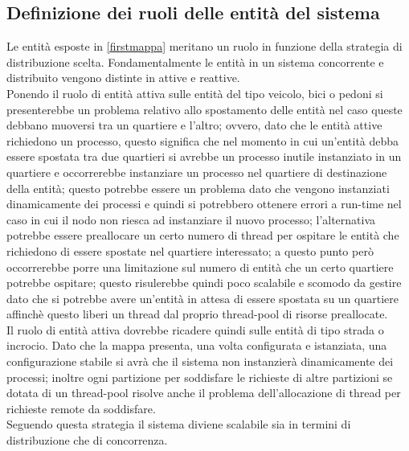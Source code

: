 \subsection{Definizione dei ruoli delle entità del sistema}
Le entità esposte in \ref{firstmappa} meritano un ruolo in funzione della strategia di distribuzione scelta. Fondamentalmente le entità in un sistema concorrente e distribuito vengono distinte in attive e reattive. \\
Ponendo il ruolo di entità attiva sulle entità del tipo veicolo, bici o pedoni si presenterebbe un problema relativo allo spostamento delle entità nel caso queste debbano muoversi tra un quartiere e l'altro; ovvero, dato che le entità attive richiedono un processo, questo significa che nel momento in cui un'entità debba essere spostata tra due quartieri si avrebbe un processo inutile instanziato in un quartiere e occorrerebbe instanziare un processo nel quartiere di destinazione della entità; questo potrebbe essere un problema dato che vengono instanziati dinamicamente dei processi e quindi si potrebbero ottenere errori a run-time nel caso in cui il nodo non riesca ad instanziare il nuovo processo; l'alternativa potrebbe essere preallocare un certo numero di thread per ospitare le entità che richiedono di essere spostate nel quartiere interessato; a questo punto però occorrerebbe porre una limitazione sul numero di entità che un certo quartiere potrebbe ospitare; questo risulerebbe quindi poco scalabile e scomodo da gestire dato che si potrebbe avere un'entità in attesa di essere spostata su un quartiere affinchè questo liberi un thread dal proprio thread-pool di risorse preallocate. \\
Il ruolo di entità attiva dovrebbe ricadere quindi sulle entità di tipo strada o incrocio. Dato che la mappa presenta, una volta configurata e istanziata, una configurazione stabile si avrà che il sistema non instanzierà dinamicamente dei processi; inoltre ogni partizione per soddisfare le richieste di altre partizioni se dotata di un thread-pool risolve anche il problema dell'allocazione di thread per richieste remote da soddisfare.\\
Seguendo questa strategia il sistema diviene scalabile sia in termini di distribuzione che di concorrenza.

